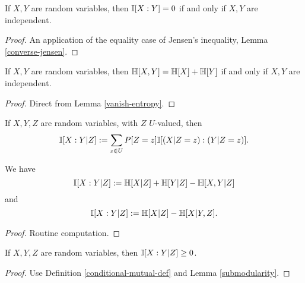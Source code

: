 \begin{lemma}
  \label{vanish-entropy}
  \leanok
  If $X,Y$ are random variables, then $\mathbb{I}[X:Y] = 0$ if and only if $X,Y$ are independent.
  \end{lemma}

  \begin{proof} \leanok
    An application of the equality case of Jensen's inequality, Lemma \ref{converse-jensen}.
  \end{proof}

\begin{corollary}\label{add-entropy}
  \leanok
  If $X,Y$ are random variables, then $\mathbb{H}[X,Y] = \mathbb{H}[X] + \mathbb{H}[Y]$ if and only if $X,Y$ are independent.
\end{corollary}

\begin{proof} \leanok
  Direct from Lemma \ref{vanish-entropy}.
\end{proof}

\begin{definition}
\label{conditional-mutual-def}
\leanok
If $X,Y,Z$ are random variables, with $Z$ $U$-valued, then
$$ \mathbb{I}[X:Y|Z] := \sum_{z \in U} P[Z=z] \mathbb{I}[(X|Z=z): (Y|Z=z)].$$
\end{definition}

\begin{lemma}
  \label{conditional-mutual-alt}
  \leanok
We have
  $$ \mathbb{I}[X:Y|Z] := \mathbb{H}[X|Z] + \mathbb{H}[Y|Z] - \mathbb{H}[X,Y|Z]$$
and
  $$ \mathbb{I}[X:Y|Z] := \mathbb{H}[X|Z] - \mathbb{H}[X|Y,Z].$$
\end{lemma}

\begin{proof} Routine computation.
\end{proof}

\begin{lemma}
\label{conditional-nonneg}
\leanok
If $X,Y,Z$ are random variables, then $\mathbb{I}[X:Y|Z] \ge 0$.
\end{lemma}
\begin{proof}
\leanok
Use Definition \ref{conditional-mutual-def} and Lemma \ref{submodularity}.
\end{proof}

